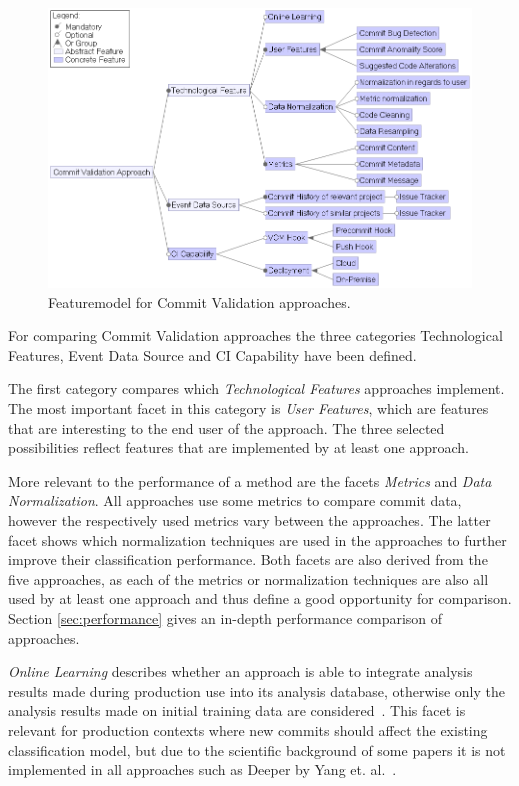 \begin{figure}[t]
	\centering
	\includegraphics[width=15cm]{images/featuremodel}
	\caption{Featuremodel for Commit Validation approaches.}
	\label{fig:featuremodel}
\end{figure}

For comparing Commit Validation approaches the three categories Technological Features, Event Data Source and CI Capability have been defined.

The first category compares which \textit{Technological Features} approaches implement. The most important facet in this category is \textit{User Features}, which are features that are interesting to the end user of the approach. The three selected possibilities reflect features that are implemented by at least one approach.

More relevant to the performance of a method are the facets \textit{Metrics} and \textit{Data Normalization}. All approaches use some metrics to compare commit data, however the respectively used metrics vary between the approaches.
The latter facet shows which normalization techniques are used in the approaches to further improve their classification performance.
Both facets are also derived from the five approaches, as each of the metrics or normalization techniques are also all used by at least one approach and thus define a good opportunity for comparison. Section \ref{sec:performance} gives an in-depth performance comparison of approaches.

\textit{Online Learning} describes whether an approach is able to integrate analysis results made during production use into its analysis database, otherwise only the analysis results made on initial training data are considered~\cite{MAL-018}. This facet is relevant for production contexts where new commits should affect the existing classification model, but due to the scientific background of some papers it is not implemented in all approaches such as Deeper by Yang et. al.~\cite{Yang2015}.

